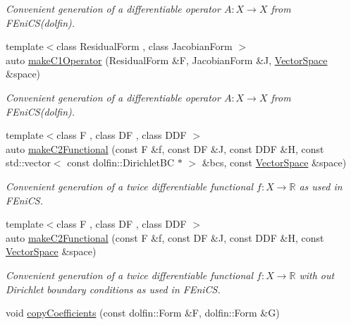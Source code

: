\begin{DoxyCompactItemize}
\begin{DoxyCompactList}\small\item\em \-Convenient generation of a differentiable operator $A: X\rightarrow X$ from \-F\-Eni\-C\-S(dolfin). \end{DoxyCompactList}\item 
{\footnotesize template$<$class Residual\-Form , class Jacobian\-Form $>$ }\\auto \hyperlink{namespaceSpacy_1_1FEniCS_a508af586ecdbc9f099759ffec06e99df}{make\-C1\-Operator} (\-Residual\-Form \&\-F, \-Jacobian\-Form \&\-J, \hyperlink{classSpacy_1_1VectorSpace}{\-Vector\-Space} \&space)
\begin{DoxyCompactList}\small\item\em \-Convenient generation of a differentiable operator $A: X\rightarrow X$ from \-F\-Eni\-C\-S(dolfin). \end{DoxyCompactList}\item 
{\footnotesize template$<$class F , class D\-F , class D\-D\-F $>$ }\\auto \hyperlink{namespaceSpacy_1_1FEniCS_a78db716003d17d5f781dfcb13a183519}{make\-C2\-Functional} (const \-F \&f, const \-D\-F \&\-J, const \-D\-D\-F \&\-H, const std\-::vector$<$ const dolfin\-::\-Dirichlet\-B\-C $\ast$ $>$ \&bcs, const \hyperlink{classSpacy_1_1VectorSpace}{\-Vector\-Space} \&space)
\begin{DoxyCompactList}\small\item\em \-Convenient generation of a twice differentiable functional $f: X\rightarrow \mathbb{R}$ as used in \-F\-Eni\-C\-S. \end{DoxyCompactList}\item 
{\footnotesize template$<$class F , class D\-F , class D\-D\-F $>$ }\\auto \hyperlink{namespaceSpacy_1_1FEniCS_a4e69e5b7265feac21653bfc2da725a75}{make\-C2\-Functional} (const \-F \&f, const \-D\-F \&\-J, const \-D\-D\-F \&\-H, const \hyperlink{classSpacy_1_1VectorSpace}{\-Vector\-Space} \&space)
\begin{DoxyCompactList}\small\item\em \-Convenient generation of a twice differentiable functional $f: X\rightarrow \mathbb{R}$ with out \-Dirichlet boundary conditions as used in \-F\-Eni\-C\-S. \end{DoxyCompactList}\item 
void \hyperlink{group__FenicsGroup_gab3d4c7c1e91a50e4e816598258b6edce}{copy\-Coefficients} (const dolfin\-::\-Form \&\-F, dolfin\-::\-Form \&\-G)

\end{DoxyCompactItemize}
